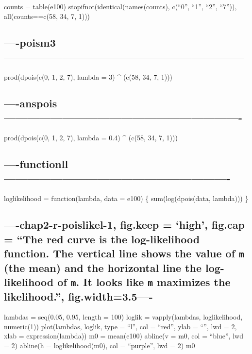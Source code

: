 \documentclass[]{article}
\begin{document}
counts = table(e100) stopifnot(identical(names(counts), c(``0'', ``1'',
``2'', ``7'')), all(counts==c(58, 34, 7, 1)))

\subsection{----poism3--------------------------------------------------------------}\label{poism3}

prod(dpois(c(0, 1, 2, 7), lambda = 3) \^{} (c(58, 34, 7, 1)))

\subsection{----anspois-------------------------------------------------------------}\label{anspois-}

prod(dpois(c(0, 1, 2, 7), lambda = 0.4) \^{} (c(58, 34, 7, 1)))

\subsection{----functionll----------------------------------------------------------}\label{functionll-}

loglikelihood = function(lambda, data = e100) \{ sum(log(dpois(data,
lambda))) \}

\subsection{\texorpdfstring{----chap2-r-poislikel-1, fig.keep = `high',
fig.cap = ``The red curve is the log-likelihood function. The vertical
line shows the value of \texttt{m} (the mean) and the horizontal line
the log-likelihood of \texttt{m}. It looks like \texttt{m} maximizes the
likelihood.'',
fig.width=3.5----}{----chap2-r-poislikel-1, fig.keep = high, fig.cap = The red curve is the log-likelihood function. The vertical line shows the value of m (the mean) and the horizontal line the log-likelihood of m. It looks like m maximizes the likelihood., fig.width=3.5----}}\label{chap2-r-poislikel-1-fig.keep-high-fig.cap-the-red-curve-is-the-log-likelihood-function.-the-vertical-line-shows-the-value-of-m-the-mean-and-the-horizontal-line-the-log-likelihood-of-m.-it-looks-like-m-maximizes-the-likelihood.-fig.width3.5-}

lambdas = seq(0.05, 0.95, length = 100) loglik = vapply(lambdas,
loglikelihood, numeric(1)) plot(lambdas, loglik, type = ``l'', col =
``red'', ylab = ``'', lwd = 2, xlab = expression(lambda)) m0 =
mean(e100) abline(v = m0, col = ``blue'', lwd = 2) abline(h =
loglikelihood(m0), col = ``purple'', lwd = 2) m0
\end{document}
